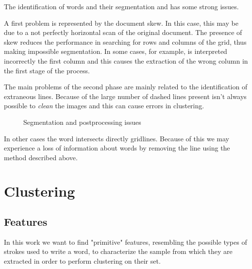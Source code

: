 \documentclass[a4paper,12pt]{article}
\begin{document}
The identification of words and their segmentation and has some strong issues.

A first problem is represented by the document skew. In this case, this may be due to a not perfectly horizontal scan of the original document. The presence of skew reduces the performance in searching for rows and columns of the grid, thus making impossible segmentation. In some cases, for example, is interpreted incorrectly the first column and this causes the extraction of the wrong column in the first stage of the process.

The main problems of the second phase are mainly related to the identification of extraneous lines. Because of the large number of dashed lines present isn't always possible to \emph{clean} the images and this can cause errors in clustering.

\begin{figure}[!ht]
 \centering
 \hspace{5mm}
 \caption{Segmentation and postprocessing issues}
 \end{figure}

In other cases the word intersects directly gridlines. Because of this we may experience a loss of information about words by removing the line using the method described above.


\section{Clustering}



\subsection{Features}



In this work we want to find "primitive" features, resembling the possible types of strokes used to write a word, to characterize the sample from which they are extracted in order to perform clustering on their set.
\end{document}
